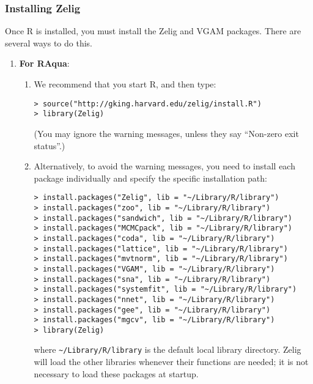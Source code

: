 \subsubsection{Installing Zelig}\label{osx.manual}

Once R is installed, you must install the Zelig and VGAM packages.
There are several ways to do this.
\begin{enumerate}
\item {\bf For RAqua}:
  \begin{enumerate}
    
  \item We recommend that you start R, and then type:
\begin{verbatim}
> source("http://gking.harvard.edu/zelig/install.R")
> library(Zelig)
\end{verbatim}
(You may ignore the warning messages, unless they say ``Non-zero exit 
status''.)
\item Alternatively, to avoid the warning messages, you need to install 
each package individually and specify the specific installation path:
\begin{verbatim}
> install.packages("Zelig", lib = "~/Library/R/library")
> install.packages("zoo", lib = "~/Library/R/library")
> install.packages("sandwich", lib = "~/Library/R/library")
> install.packages("MCMCpack", lib = "~/Library/R/library")
> install.packages("coda", lib = "~/Library/R/library")
> install.packages("lattice", lib = "~/Library/R/library")
> install.packages("mvtnorm", lib = "~/Library/R/library")
> install.packages("VGAM", lib = "~/Library/R/library")
> install.packages("sna", lib = "~/Library/R/library")
> install.packages("systemfit", lib = "~/Library/R/library")
> install.packages("nnet", lib = "~/Library/R/library")
> install.packages("gee", lib = "~/Library/R/library")
> install.packages("mgcv", lib = "~/Library/R/library")
> library(Zelig)
\end{verbatim}
    where \texttt{\~{}/Library/R/library} is the default local library
    directory. Zelig will load the other libraries whenever their functions
    are needed; it is not necessary to load these packages at startup.
    

\end{enumerate}
\end{enumerate}
